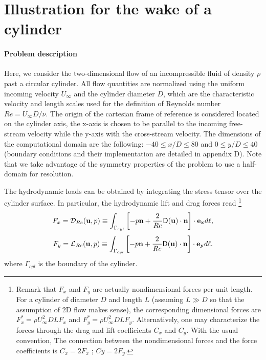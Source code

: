 \documentclass[twocolumn,10pt]{asme2ej}
\newcommand{\be}[1]{ \begin{equation} \label{#1}}
\newcommand{\ee}{\end{equation}}
\begin{document}
\section{Illustration for the wake of a cylinder} 
\vspace{.2cm}

\paragraph{Problem description}
Here, we consider the two-dimensional flow of an incompressible fluid of density $\rho$ past a circular cylinder. 
All flow quantities are normalized using the uniform incoming velocity $U_{\infty}$ and the cylinder diameter $D$, 
which are the characteristic velocity and length scales used for the definition of Reynolds number $Re= U_{\infty} D / \nu$.
The origin of the cartesian frame of reference is considered located on the cylinder axis, the x-axis is chosen to be parallel to 
the incoming free-stream velocity while the y-axis with the cross-stream velocity. 
The dimensions of the computational domain are the following: $-40 \le x/D \le 80$ and $0 \le y/D \le 40$ (boundary conditions and their implementation are detailed in appendix D).
Note that we take advantage of the symmetry properties of the problem to use a half-domain for resolution. 

The hydrodynamic loads can be obtained by integrating the stress tensor over the cylinder surface.
In particular, the hydrodynamic lift and drag forces read
\footnote{ Remark that $F_x$ and $F_y$ are actually nondimensional forces per unit length. 
For a cylinder of diameter $D$ and length $L$ (assuming $L\gg D$ so that the assumption of 2D flow makes sense), 
the corresponding dimensional forces are $F_x^* = \rho U_\infty^2 D L F_x $ and $F_y^* = \rho U_\infty^2 D L F_y$. 
Alternatively, one may characterize the forces through the drag and lift coefficients $C_x$ and $C_y$. With the usual convention, 
The connection between the nondimensional forces and the force coefficients is $C_x = 2 F_x$ ; $Cy = 2 F_y$.
}
\be{drag}
F_x = {\cal D}_{Re} ({\bf u},p) \equiv 
  \int_{\Gamma_{cyl}} \left[-p {\bf n} + \frac{2}{Re} {\mathsf{D}}({\bf u}) \cdot {\bf n} \right]   \cdot {\bf e_x} d\ell,
\ee
\be{lift}
F_y = {\cal L}_{Re} ({\bf u},p) \equiv
  \int_{\Gamma_{cyl}} \left[-p {\bf n} + \frac{2}{Re} {\mathsf{D}}({\bf u}) \cdot {\bf n} \right]   \cdot {\bf e_y} d\ell. 
\ee
where $\Gamma_{cyl}$ is the boundary of the cylinder. %
\end{document}
